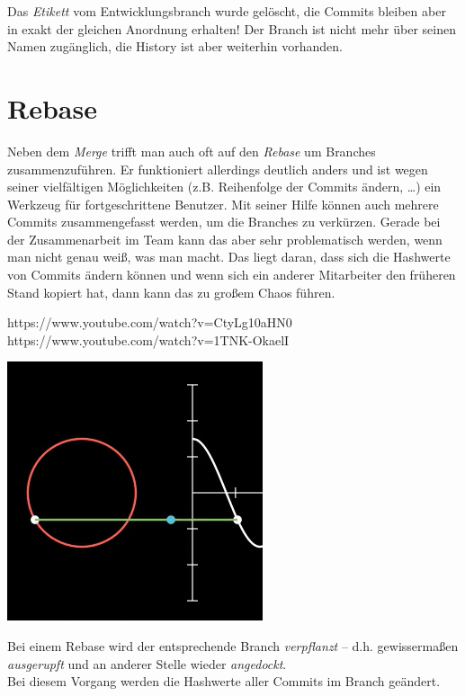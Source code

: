 \documentclass[
  letterpaper,
  DIV=11]{scrreprt}
\begin{document}
Das \emph{Etikett} vom Entwicklungsbranch wurde gelöscht, die Commits
bleiben aber in exakt der gleichen Anordnung erhalten! Der Branch ist
nicht mehr über seinen Namen zugänglich, die History ist aber weiterhin
vorhanden.

\section{Rebase}\label{rebase}

Neben dem \emph{Merge} trifft man auch oft auf den \emph{Rebase} um
Branches zusammenzuführen. Er funktioniert allerdings deutlich anders
und ist wegen seiner vielfältigen Möglichkeiten (z.B. Reihenfolge der
Commits ändern, \ldots) ein Werkzeug für fortgeschrittene Benutzer. Mit
seiner Hilfe können auch mehrere Commits zusammengefasst werden, um die
Branches zu verkürzen. Gerade bei der Zusammenarbeit im Team kann das
aber sehr problematisch werden, wenn man nicht genau weiß, was man
macht. Das liegt daran, dass sich die Hashwerte von Commits ändern
können und wenn sich ein anderer Mitarbeiter den früheren Stand kopiert
hat, dann kann das zu großem Chaos führen.

https://www.youtube.com/watch?v=CtyLg10aHN0
https://www.youtube.com/watch?v=1TNK-OkaelI

\includegraphics{bilder/bash/rebase_nach_branch_delete.png}

Bei einem Rebase wird der entsprechende Branch \emph{verpflanzt} -- d.h.
gewissermaßen \emph{ausgerupft} und an anderer Stelle wieder
\emph{angedockt}.\\
Bei diesem Vorgang werden die Hashwerte aller Commits im Branch
geändert.
\end{document}

